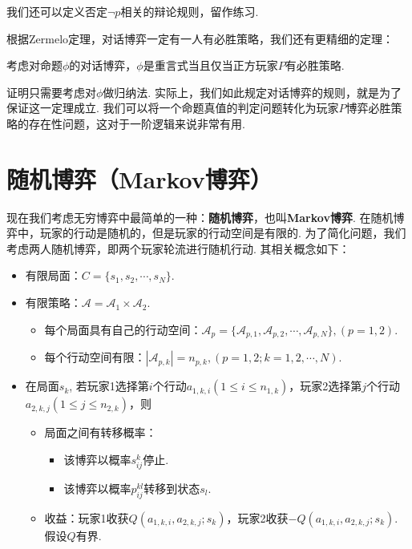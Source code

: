 我们还可以定义否定$\neg p$相关的辩论规则，留作练习. 

根据Zermelo定理，对话博弈一定有一人有必胜策略，我们还有更精细的定理：
\begin{theorem}\label{theorem:dialogue-game}
考虑对命题$\phi$的对话博弈，$\phi$是重言式当且仅当正方玩家$P$有必胜策略.
\end{theorem}

证明只需要考虑对$\phi$做归纳法. 实际上，我们如此规定对话博弈的规则，就是为了保证这一定理成立. 我们可以将一个命题真值的判定问题转化为玩家$P$博弈必胜策略的存在性问题，这对于一阶逻辑来说非常有用.


\section{随机博弈（Markov博弈）} %
现在我们考虑无穷博弈中最简单的一种：\textbf{随机博弈}，也叫\textbf{Markov博弈}. 在随机博弈中，玩家的行动是随机的，但是玩家的行动空间是有限的. 为了简化问题，我们考虑两人随机博弈，即两个玩家轮流进行随机行动. 其相关概念如下：
\begin{itemize}
    \item 有限局面：$C=\{s_1,s_2,\cdots,s_N\}$.
    \item 有限策略：$\mathcal A=\mathcal A_1\times \mathcal A_2.$
    \begin{itemize}
        \item 每个局面具有自己的行动空间：$\mathcal A_p = \{\mathcal A_{p,1},\mathcal A_{p,2},\cdots, \mathcal A_{p,N}\}, (p=1,2)$.
        \item 每个行动空间有限：$|\mathcal A_{p,k}|=n_{p,k},(p=1,2;k=1,2,\cdots,N)$.
    \end{itemize}
    \item 在局面$s_k$, 若玩家1选择第$i$个行动$a_{1,k,i}(1\leq i\leq n_{1,k})$，玩家2选择第$j$个行动$a_{2,k,j}(1\leq j\leq n_{2,k})$，则
    
    \begin{itemize}
        \item 局面之间有转移概率：
        \begin{itemize}
            \item 该博弈以概率$s_{ij}^k$停止.
            \item 该博弈以概率$p_{ij}^{kl}$转移到状态$s_l$.
        \end{itemize}
        \item 收益：玩家1收获$Q(a_{1,k,i},a_{2,k,j};s_k)$，玩家2收获$-Q(a_{1,k,i},a_{2,k,j};s_k)$. 假设$Q$有界.
    \end{itemize}
\end{itemize}

